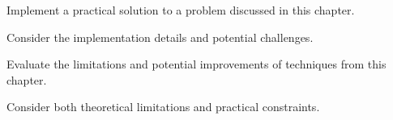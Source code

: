 \begin{exercisebox}[hard]
\begin{problem}
Implement a practical solution to a problem discussed in this chapter.
\end{problem}
\begin{hintbox}
Consider the implementation details and potential challenges.
\end{hintbox}
\end{exercisebox}

\begin{exercisebox}[hard]
\begin{problem}
Evaluate the limitations and potential improvements of techniques from this chapter.
\end{problem}
\begin{hintbox}
Consider both theoretical limitations and practical constraints.
\end{hintbox}
\end{exercisebox}
